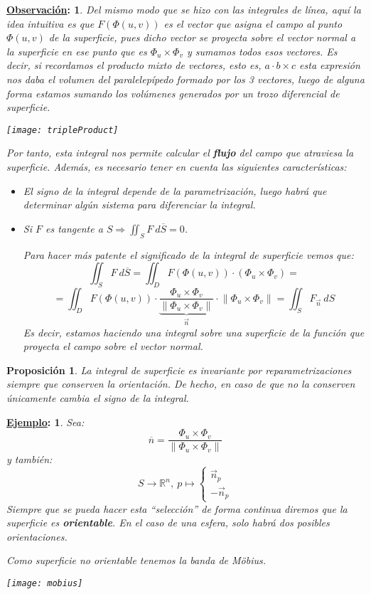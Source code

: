 \documentclass[10pt,a4paper,openright]{book}
\theoremstyle{break}
\newtheorem*{prop}{Proposición}
\newtheorem*{obs}{\underline{Observación}:}
\newtheorem*{ej}{\underline{Ejemplo}:}
\newcommand{\dif}[1]{\ d#1}
\begin{document}
\begin{obs}
Del mismo modo que se hizo con las integrales de línea, aquí la idea intuitiva es que $F\left( \Phi\left( u, v \right) \right)$ es el vector que asigna el campo al punto $\Phi\left( u, v \right)$ de la superficie, pues dicho vector se proyecta sobre el vector normal a la superficie en ese punto que es $\Phi_u \times \Phi_v$ y sumamos todos esos vectores. Es decir, si recordamos el producto mixto de vectores, esto es, $a\cdot b\times c$ esta expresión nos daba el volumen del paralelepípedo formado por los 3 vectores, luego de alguna forma estamos sumando los volúmenes generados por un trozo diferencial de superficie.
\begin{center}
    \texttt{[image: tripleProduct]} 
\end{center}Por tanto, esta integral nos permite calcular el \textbf{flujo} del campo que atraviesa la superficie. Además, es necesario tener en cuenta las siguientes características:
\begin{itemize}
    \item El signo de la integral depende de la parametrización, luego habrá que determinar algún sistema para diferenciar la integral.
    \item Si $F$ es tangente a $S \Rightarrow \iint_{S} F \dif{\overline{S}} = 0$.

Para hacer más patente el significado de la integral de superficie vemos que:
$$\iint_{S} F \dif{\overline{S}} = \iint_{D} F\left( \Phi\left( u, v \right) \right) \cdot \left( \Phi_u \times \Phi_v \right) =$$
$$= \iint_{D} F\left( \Phi\left( u, v \right) \right) \cdot \underbrace{\frac{\Phi_u \times \Phi_v}{\lVert \Phi_u \times \Phi_v \rVert}}_{\vec{n}} \cdot \lVert \Phi_u \times \Phi_v \rVert = \iint_{S} F_{\vec{n}} \dif{S}$$
Es decir, estamos haciendo una integral sobre una superficie de la función que proyecta el campo sobre el vector normal.
\end{itemize}
\end{obs}

\begin{prop}
La integral de superficie es invariante por reparametrizaciones siempre que conserven la orientación. De hecho, en caso de que no la conserven únicamente cambia el signo de la integral.
\end{prop}

\begin{ej}
Sea: 
$$\overline{n} = \frac{\Phi_u \times \Phi_v}{\lVert \Phi_u \times \Phi_v \rVert}$$
y también: 
$$S \rightarrow \mathbb{R}^n,\ p \mapsto \begin{cases}
    \vec{n}_p\\
    -\vec{n}_p
\end{cases} $$
Siempre que se pueda hacer esta ``selección'' de forma continua diremos que la superficie es \textbf{orientable}. En el caso de una esfera, solo habrá dos posibles orientaciones.

Como superficie no orientable tenemos la banda de Möbius.
\begin{center}
    \texttt{[image: mobius]} 
\end{center}
\end{ej}
\end{document}
